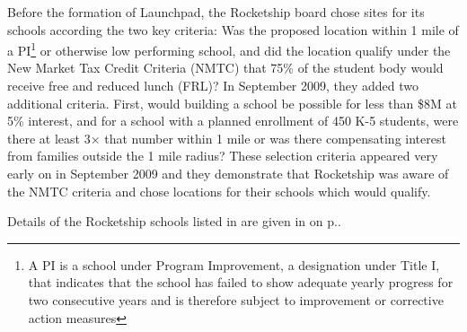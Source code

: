 Before the formation of Launchpad, the Rocketship board chose sites for its schools according the two key criteria: Was the proposed location within 1 mile of a PI\footnote{A PI is a school under Program Improvement, a designation under Title I, that indicates that the school has failed to show adequate yearly progress for two consecutive years and is therefore subject to improvement or corrective action measures} or otherwise low performing school, and did the location qualify under the New Market Tax Credit Criteria (NMTC) that 75\% of the student body would receive free and reduced lunch (FRL)? In September 2009, they added two additional criteria. First, would building a school be possible for less than \$8M at 5\% interest, and for a school with a planned enrollment of 450 K-5 students, were there at least 3× that number within 1 mile or was there compensating interest from families outside the 1 mile radius? These selection criteria appeared very early on in September 2009\parencite{RSED2009b} and they demonstrate that Rocketship was aware of the NMTC criteria and chose locations for their schools which would qualify.

Details of the Rocketship schools listed in  are given in  on p.\pageref{appx:rocketship-property-info}.

